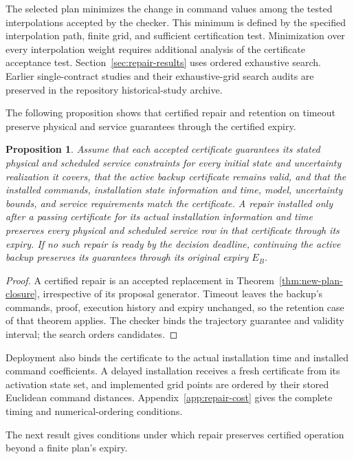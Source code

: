 \documentclass[journal,10pt]{IEEEtran}
\newtheorem{proposition}{Proposition}
\newcommand{\appref}[1]{Appendix~\ref{#1}}
\begin{document}
The selected plan minimizes the change in command values among the tested
interpolations accepted by the checker. This minimum is defined by the
specified interpolation path, finite grid, and sufficient certification
test. Minimization over every interpolation weight requires additional
analysis of the certificate acceptance test. Section~\ref{sec:repair-results} uses ordered
exhaustive search. Earlier single-contract studies and their exhaustive-grid
search audits are preserved in the repository historical-study archive.

The following proposition shows that certified repair and retention on timeout preserve physical and service guarantees through the certified expiry.

\begin{proposition}
\label{prop:repair-execution}
Assume that each accepted certificate guarantees its stated physical and
scheduled service constraints for every initial state and uncertainty
realization it covers, that the active backup certificate remains valid,
and that the installed commands, installation state information and time,
model, uncertainty bounds, and service requirements match the certificate. A repair installed only after a passing certificate for its actual
installation information and time preserves every physical and scheduled
service row in that certificate through its expiry. If no such repair is
ready by the decision deadline, continuing the active backup preserves its
guarantees through its original expiry $E_B$.
\end{proposition}
\begin{proof}
A certified repair is an accepted replacement in
Theorem~\ref{thm:new-plan-closure}, irrespective of its proposal generator.
Timeout leaves the backup's commands, proof, execution history and expiry
unchanged, so the retention case of that theorem applies. The checker binds
the trajectory guarantee and validity interval; the search orders candidates.
\end{proof}

Deployment also binds the certificate to the actual installation time and
installed command coefficients. A delayed installation receives a fresh
certificate from its activation state set, and implemented grid points are
ordered by their stored Euclidean command distances. \appref{app:repair-cost}
gives the complete timing and numerical-ordering conditions.

The next result gives conditions under which repair preserves certified operation beyond a finite plan's expiry.
\end{document}
